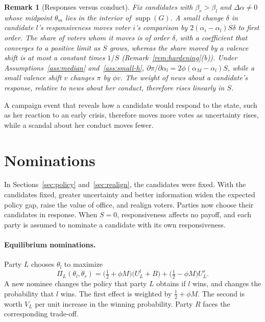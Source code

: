 \documentclass[12pt,letterpaper]{article}
\newtheorem{remark}{Remark}
\begin{document}
\begin{remark}[Responses versus conduct]\label{rem:responses}
Fix candidates with $\beta_r>\beta_l$ and $\Delta\alpha\ne0$ whose midpoint $\theta_m$ lies in the interior of $\operatorname{supp}(G)$. A small change $\delta$ in candidate $l$'s responsiveness moves voter $i$'s comparison by $2(\alpha_i-\alpha_l)S\delta$ to first order. The share of voters whom it moves is of order $\delta$, with a coefficient that converges to a positive limit as $S$ grows, whereas the share moved by a valence shift is at most a constant times $1/S$ (Remark~\ref{rem:hardening}(b)). Under Assumptions~\ref{ass:median} and~\ref{ass:small-h}, $\partial\pi/\partial\alpha_l=2\phi(\alpha_M-\alpha_l)S$, while a small valence shift $v$ changes $\pi$ by $\phi v$. The weight of news about a candidate's response, relative to news about her conduct, therefore rises linearly in $S$.
\end{remark}

A campaign event that reveals how a candidate would respond to the state, such as her reaction to an early crisis, therefore moves more votes as uncertainty rises, while a scandal about her conduct moves fewer.

\section{Nominations}\label{sec:competition}

In Sections~\ref{sec:policy} and~\ref{sec:realign}, the candidates were fixed. With the candidates fixed, greater uncertainty and better information widen the expected policy gap, raise the value of office, and realign voters. Parties now choose their candidates in response. When $S=0$, responsiveness affects no payoff, and each party is assumed to nominate a candidate with its own responsiveness.

\paragraph{Equilibrium nominations.}
Party $L$ chooses $\theta_l$ to maximize
\[
\Pi_L(\theta_l,\theta_r)=\Big(\tfrac12+\phi M\Big)\big(U_L^l+B\big)+\Big(\tfrac12-\phi M\Big)U_L^r.
\]
A new nominee changes the policy that party $L$ obtains if $l$ wins, and changes the probability that $l$ wins. The first effect is weighted by $\tfrac12+\phi M$. The second is worth $V_L$ per unit increase in the winning probability. Party $R$ faces the corresponding trade-off.
\end{document}
